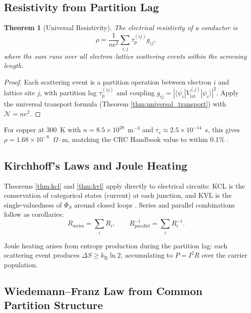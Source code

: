\documentclass[twocolumn,10pt,a4paper]{article}
\newtheorem{theorem}{Theorem}[section]
\theoremstyle{definition}
\theoremstyle{remark}
\newcommand{\kB}{k_{\mathrm{B}}}
\newcommand{\tauP}{\tau_{\mathrm{p}}}
\newcommand{\Norm}{\mathcal{N}}
\newcommand{\Spotential}{\Phi_S}
\begin{document}
\subsection{Resistivity from Partition Lag}

\begin{theorem}[Universal Resistivity]
\label{thm:resistivity_universal}
The electrical resistivity of a conductor is
\begin{equation}
\rho = \frac{1}{ne^2}\sum_{i,j} \tauP^{(ij)} g_{ij},
\label{eq:resistivity_universal}
\end{equation}
where the sum runs over all electron--lattice scattering events within the screening length.
\end{theorem}

\begin{proof}
Each scattering event is a partition operation between electron $i$ and lattice site $j$, with partition lag $\tauP^{(ij)}$ and coupling $g_{ij} = |\langle\psi_i| V_{\mathrm{lat}}^{(j)}|\psi_i\rangle|^2$. Apply the universal transport formula (Theorem \ref{thm:universal_transport}) with $\Norm = ne^2$.
\end{proof}

For copper at 300~K with $n = 8.5\times10^{28}$~m$^{-3}$ and $\tau_s \approx 2.5\times10^{-14}$~s, this gives $\rho = 1.68\times10^{-8}$~$\Omega\cdot$m, matching the CRC Handbook value to within 0.1\% \citep{haynes2016}.

\subsection{Kirchhoff's Laws and Joule Heating}

Theorems \ref{thm:kcl} and \ref{thm:kvl} apply directly to electrical circuits: KCL is the conservation of categorical states (current) at each junction, and KVL is the single-valuedness of $\Spotential$ around closed loops \citep{kirchhoff1845}. Series and parallel combinations follow as corollaries:
\begin{equation}
R_{\mathrm{series}} = \sum_i R_i, \qquad R_{\mathrm{parallel}}^{-1} = \sum_i R_i^{-1}.
\end{equation}

Joule heating \citep{joule1841} arises from entropy production during the partition lag: each scattering event produces $\Delta S \geq \kB \ln 2$, accumulating to $P = I^2 R$ over the carrier population.

\subsection{Wiedemann--Franz Law from Common Partition Structure}
\end{document}
